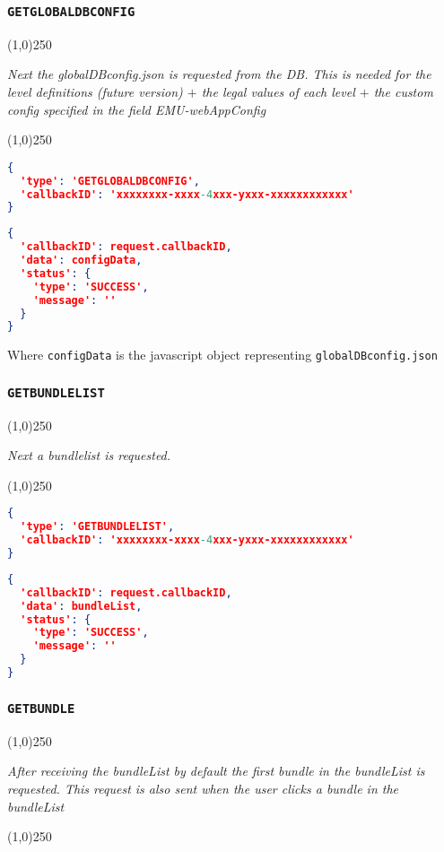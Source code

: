 \documentclass[A4,12pt, utf8]{article}
\begin{document}
\subsubsection{\texttt{GETGLOBALDBCONFIG}}
\begin{center}
  \line(1,0){250}

  \textit{Next the globalDBconfig.json is requested from the DB. This is needed for the level definitions (future version) $+$ the legal values of each level $+$ the custom config specified in the field EMU-webAppConfig}

  \line(1,0){250}
\end{center}


\begin{lstlisting}[caption=Request content, language=json]
{
  'type': 'GETGLOBALDBCONFIG', 
  'callbackID': 'xxxxxxxx-xxxx-4xxx-yxxx-xxxxxxxxxxxx'
}
\end{lstlisting}

\begin{lstlisting}[caption=response content, language=json]
{
  'callbackID': request.callbackID,
  'data': configData,
  'status': {
    'type': 'SUCCESS',
    'message': ''
  }
}
\end{lstlisting}
Where \texttt{configData} is the javascript object representing \texttt{globalDBconfig.json}

\subsubsection{\texttt{GETBUNDLELIST}}
\begin{center}
  \line(1,0){250}

  \textit{Next a bundlelist is requested.}

  \line(1,0){250}
\end{center}


\begin{lstlisting}[caption=Request content, language=json]
{
  'type': 'GETBUNDLELIST', 
  'callbackID': 'xxxxxxxx-xxxx-4xxx-yxxx-xxxxxxxxxxxx'
}
\end{lstlisting}

\begin{lstlisting}[caption=response content, language=json]
{
  'callbackID': request.callbackID,
  'data': bundleList,
  'status': {
    'type': 'SUCCESS',
    'message': ''
  }
}
\end{lstlisting}

\subsubsection{\texttt{GETBUNDLE}}
\begin{center}
  \line(1,0){250}

  \textit{After receiving the bundleList by default the first bundle in the bundleList is requested. This request is also sent when the user clicks a bundle in the bundleList}

  \line(1,0){250}
\end{center}
\end{document}
